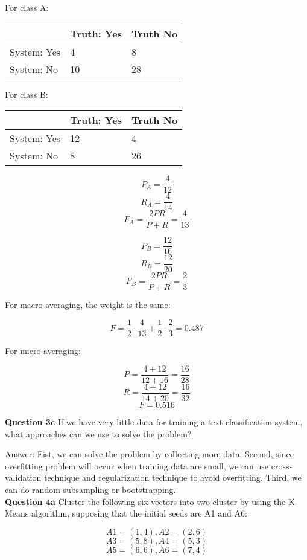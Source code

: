 \documentclass[11pt,a4paper]{report}
\begin{document}
\begin{multicols*}{2}
\noindent For class A:
\begin{center}
\begin{tabular}{| l | l | l |}
\hline
             & Truth: Yes & Truth No \\ \hline
System: Yes  & 4  & 8 \\ \hline
System: No   & 10 & 28\\ \hline
\end{tabular}
\end{center}

\noindent For class B:
\begin{center}
\begin{tabular}{| l | l | l |}
\hline
             & Truth: Yes & Truth No \\ \hline
System: Yes  & 12 & 4  \\ \hline
System: No   & 8  & 26 \\ \hline
\end{tabular}
\end{center}

$$P_A = \frac{4}{12}$$
$$R_A = \frac{4}{14}$$
$$F_A = \frac{2PR}{P+R} = \frac{4}{13}$$

$$P_B = \frac{12}{16}$$
$$R_B = \frac{12}{20}$$
$$F_B = \frac{2PR}{P+R} = \frac{2}{3}$$

\noindent For macro-averaging, the weight is the same:

$$F = \frac{1}{2} \cdot \frac{4}{13} + \frac{1}{2} \cdot \frac{2}{3} = 0.487$$

\noindent For micro-averaging:

$$P = \frac{4 + 12}{12 + 16} = \frac{16}{28}$$
$$R = \frac{4 + 12}{14 + 20} = \frac{16}{32}$$
$$F = 0.516$$

\noindent \textbf{Question 3c} If we have very little data for training a text classification system, what approaches can we use to solve the problem?

\noindent Answer: Fist, we can solve the problem by collecting more data. Second, since overfitting problem will occur when training data are small, we can use cross-validation technique and regularization technique to avoid overfitting. Third, we can do random subsampling or bootstrapping. \\

\noindent \textbf{Question 4a} Cluster the following six vectors into two cluster by using the K-Means algorithm, supposing that the initial seeds are A1 and A6:

$$A1=(1,4), A2=(2,6)$$
$$A3=(5,8), A4=(5,3)$$
$$A5=(6,6), A6=(7,4)$$


\end{multicols*}
\end{document}
